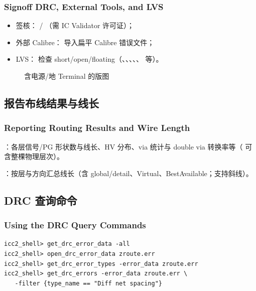 \subsubsection*{Signoff DRC, External Tools, and LVS}

\begin{itemize}
  \item 签核： / （需 IC Validator 许可证）；
  \item 外部 Calibre： 导入扁平 Calibre 错误文件；
  \item LVS： 检查 short/open/floating（、、、、、 等）。
\end{itemize}

\begin{figure}[htbp]
\centering
{}
\caption{含电源/地 Terminal 的版图}
\label{fig:pg-terminals}
\end{figure}

\subsection{报告布线结果与线长}
\subsubsection*{Reporting Routing Results and Wire Length}

：各层信号/PG 形状数与线长、HV 分布、via 统计与 double via 转换率等（ 可含整棵物理层次）。

：按层与方向汇总线长（含 global/detail、Virtual、BestAvailable；支持斜线）。

\subsection{DRC 查询命令}
\subsubsection*{Using the DRC Query Commands}

\begin{lstlisting}
icc2_shell> get_drc_error_data -all
icc2_shell> open_drc_error_data zroute.err
icc2_shell> get_drc_error_types -error_data zroute.err
icc2_shell> get_drc_errors -error_data zroute.err \
   -filter {type_name == "Diff net spacing"}
\end{lstlisting}

